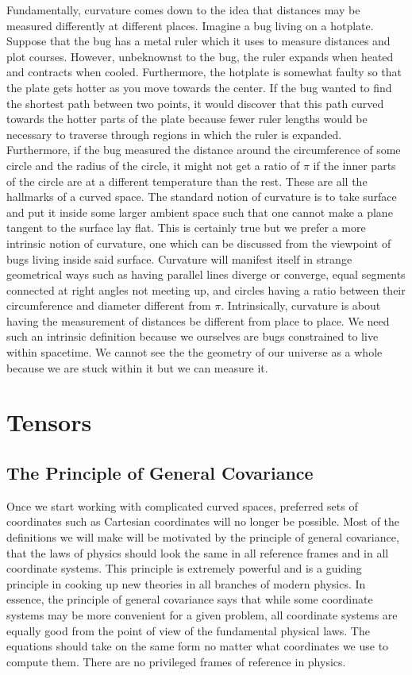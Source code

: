 \documentclass[11pt, a4paper]{article}
\begin{document}
Fundamentally, curvature comes down to the idea that distances may be measured differently at different places. Imagine a bug living on a hotplate. Suppose that the bug has a metal ruler which it uses to measure distances and plot courses. However, unbeknownst to the bug, the ruler expands when heated and contracts when cooled. Furthermore, the hotplate is somewhat faulty so that the plate gets hotter as you move towards the center. If the bug wanted to find the shortest path between two points, it would discover that this path curved towards the hotter parts of the plate because fewer ruler lengths would be necessary to traverse through regions in which the ruler is expanded. Furthermore, if the bug measured the distance around the circumference of some circle and the radius of the circle, it might not get a ratio of $\pi$ if the inner parts of the circle are at a different temperature than the rest. These are all the hallmarks of a curved space. The standard notion of curvature is to take surface and put it inside some larger ambient space such that one cannot make a plane tangent to the surface lay flat. This is certainly true but we prefer a more intrinsic notion of curvature, one which can be discussed from the viewpoint of bugs living inside said surface. Curvature will manifest itself in strange geometrical ways such as having parallel lines diverge or converge, equal segments connected at right angles not meeting up, and circles having a ratio between their circumference and diameter different from $\pi$. Intrinsically, curvature is about having the measurement of distances be different from place to place. We need such an intrinsic definition because we ourselves are bugs constrained to live within spacetime. We cannot see the the geometry of our universe as a whole because we are stuck within it but we can measure it.

\section{Tensors}

\subsection{The Principle of General Covariance}

Once we start working with complicated curved spaces, preferred sets of coordinates such as Cartesian coordinates will no longer be possible. Most of the definitions we will make will be motivated by the principle of general covariance, that the laws of physics should look the same in all reference frames and in all coordinate systems. This principle is extremely powerful and is a guiding principle in cooking up new theories in all branches of modern physics. In essence, the principle of general covariance says that while some coordinate systems may be more convenient for a given problem, all coordinate systems are equally good from the point of view of the fundamental physical laws. The equations should take on the same form no matter what coordinates we use to compute them. There are no privileged frames of reference in physics.   
\end{document}
